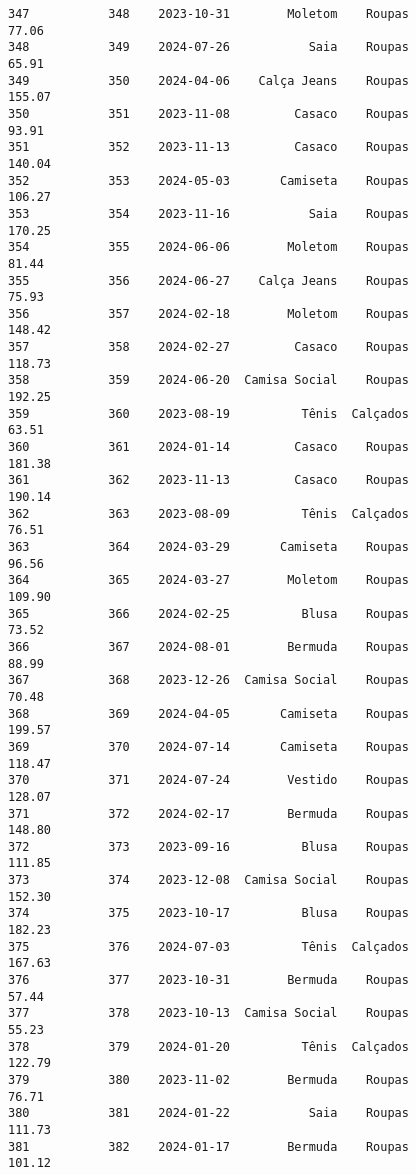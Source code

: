 \documentclass[11pt]{article}
\begin{document}
\begin{Verbatim}[commandchars=\\\{\}]
347           348    2023-10-31        Moletom    Roupas           77.06   
348           349    2024-07-26           Saia    Roupas           65.91   
349           350    2024-04-06    Calça Jeans    Roupas          155.07   
350           351    2023-11-08         Casaco    Roupas           93.91   
351           352    2023-11-13         Casaco    Roupas          140.04   
352           353    2024-05-03       Camiseta    Roupas          106.27   
353           354    2023-11-16           Saia    Roupas          170.25   
354           355    2024-06-06        Moletom    Roupas           81.44   
355           356    2024-06-27    Calça Jeans    Roupas           75.93   
356           357    2024-02-18        Moletom    Roupas          148.42   
357           358    2024-02-27         Casaco    Roupas          118.73   
358           359    2024-06-20  Camisa Social    Roupas          192.25   
359           360    2023-08-19          Tênis  Calçados           63.51   
360           361    2024-01-14         Casaco    Roupas          181.38   
361           362    2023-11-13         Casaco    Roupas          190.14   
362           363    2023-08-09          Tênis  Calçados           76.51   
363           364    2024-03-29       Camiseta    Roupas           96.56   
364           365    2024-03-27        Moletom    Roupas          109.90   
365           366    2024-02-25          Blusa    Roupas           73.52   
366           367    2024-08-01        Bermuda    Roupas           88.99   
367           368    2023-12-26  Camisa Social    Roupas           70.48   
368           369    2024-04-05       Camiseta    Roupas          199.57   
369           370    2024-07-14       Camiseta    Roupas          118.47   
370           371    2024-07-24        Vestido    Roupas          128.07   
371           372    2024-02-17        Bermuda    Roupas          148.80   
372           373    2023-09-16          Blusa    Roupas          111.85   
373           374    2023-12-08  Camisa Social    Roupas          152.30   
374           375    2023-10-17          Blusa    Roupas          182.23   
375           376    2024-07-03          Tênis  Calçados          167.63   
376           377    2023-10-31        Bermuda    Roupas           57.44   
377           378    2023-10-13  Camisa Social    Roupas           55.23   
378           379    2024-01-20          Tênis  Calçados          122.79   
379           380    2023-11-02        Bermuda    Roupas           76.71   
380           381    2024-01-22           Saia    Roupas          111.73   
381           382    2024-01-17        Bermuda    Roupas          101.12   

\end{Verbatim}
\end{document}
